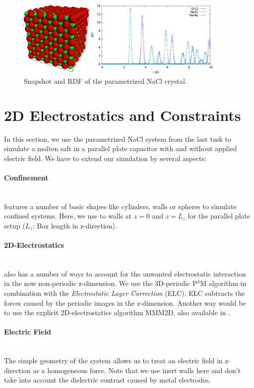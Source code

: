 \documentclass[
a4paper,                        %
11pt,                           %
twoside,                        %
footsepline,                    %
headsepline,                    %
headexclude,                    %
footexclude,                    %
pagesize,                       %
]{scrartcl}
\begin{document}
\begin{figure}[h]
  \centering
  \includegraphics[width=0.9\textwidth]{figures/nacl_units}
  \caption{Snapshot and RDF of the parametrized NaCl crystal.}
  \label{fig:nacl_units}
\end{figure}

\section{2D Electrostatics and Constraints}

In this section, we use the parametrized NaCl system from the last task to simulate a molten salt in a
parallel plate capacitor with and without applied electric field. We have to extend our simulation by several aspects:

\paragraph{Confinement}\mbox{}\\
\es features a number of basic shapes like cylinders, walls or spheres to simulate confined systems.
Here, we use to walls at $z = 0$ and $z = L_z$ for the parallel plate setup ($L_z$: Box length in z-direction).
\paragraph{2D-Electrostatics}\mbox{}\\
\es also has a number of ways to account for the unwanted electrostatic interaction in the now non-periodic z-dimension.
We use the 3D-periodic P$^3$M algorithm in combination with the \emph{Electrostatic Layer Correction} (ELC). 
ELC subtracts the forces caused by the periodic images in the z-dimension. Another way would be to use the explicit 2D-electrostatics algorithm
MMM2D, also available in \es.
\paragraph{Electric Field}\mbox{}\\
The simple geometry of the system allows us to treat an electric field in z-direction as a homogeneous force.
Note that we use inert walls here and don't take into account the dielectric contrast caused by metal electrodes.
\end{document}
